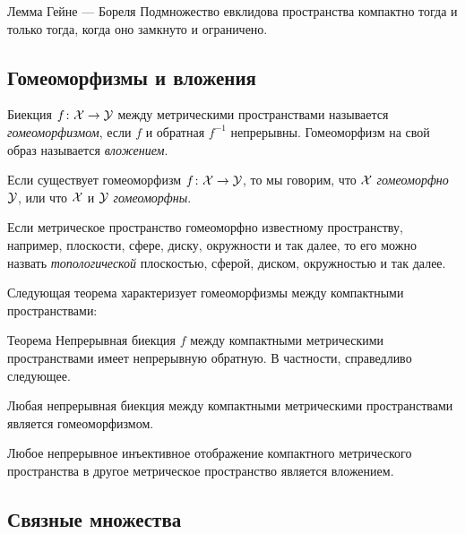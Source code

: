 {\sloppy

\begin{thm}{Лемма Гейне --- Бореля}\label{thm:Heine--Borel}
Подмножество евклидова пространства компактно тогда и только тогда, когда оно замкнуто и ограничено.
\end{thm}

}

\subsection*{Гомеоморфизмы и вложения}

Биекция $f\colon\mathcal{X}\to\mathcal{Y}$ между метрическими пространствами называется \emph{гомеоморфизмом}, если $f$ и обратная $f^{-1}$ непрерывны.
Гомеоморфизм на свой образ называется \emph{вложением}.

Если существует гомеоморфизм $f\colon\mathcal{X}\to \mathcal{Y}$,
то мы говорим, что ${\mathcal{X}}$ {}\emph{гомеоморфно} $\mathcal{Y}$,
или что $\mathcal{X}$ и $\mathcal{Y}$ {}\emph{гомеоморфны}.

{\sloppy

Если метрическое пространство гомеоморфно известному пространству, например, плоскости, сфере, диску, окружности и так далее,
то его можно назвать \emph{топологической} плоскостью, сферой, диском, окружностью и так далее.

}

Следующая теорема характеризует гомеоморфизмы между компактными пространствами:

\begin{thm}{Теорема}\label{thm:Hausdorff-compact}
Непрерывная биекция $f$ между компактными метрическими пространствами имеет непрерывную обратную.
В частности, справедливо следующее.

\begin{subthm}{}
Любая непрерывная биекция между компактными метрическими пространствами
является гомеоморфизмом.
\end{subthm}

{\sloppy

\begin{subthm}{}
Любое непрерывное инъективное отображение компактного метрического пространства в другое метрическое пространство
является вложением.
\end{subthm}

}

\end{thm}

\subsection*{Связные множества}

